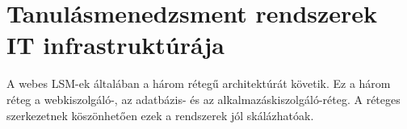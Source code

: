 \chapter{Tanulásmenedzsment rendszerek IT infrastruktúrája}

A webes LSM-ek általában a három rétegű architektúrát követik. Ez a három réteg a webkiszolgáló-, az adatbázis- és az alkalmazáskiszolgáló-réteg. A réteges szerkezetnek köszönhetően ezek a rendszerek jól skálázhatóak.






